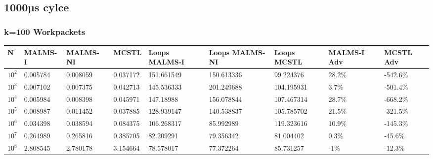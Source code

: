\documentclass[landscape]{article}
\begin{document}
\subsection*{1000µs cylce}
\subsubsection{k=100 Workpackets}
\begin{tabular}{l|l|l|l|l|l|l|l|l}
N	& MALMS-I 	& MALMS-NI	& MCSTL		& Loops MALMS-I	& Loops MALMS-NI & Loops MCSTL & MALMS-I Adv	& MCSTL Adv		\\
\hline
$10^2$		& 0.005784	& 0.008059	& 0.037172	& 151.661549	& 150.613336	& 99.224376	& 28.2\%  	& -542.6\% \\
$10^3$		& 0.007102	& 0.007375	& 0.042713	& 145.536333	& 201.249688	& 104.195931	& 3.7\%  	& -501.4\% \\
$10^4$		& 0.005984	& 0.008398	& 0.045971	& 147.18988	& 156.078844	& 107.467314	& 28.7\%  	& -668.2\% \\
$10^5$		& 0.008987	& 0.011452	& 0.037885	& 128.939147	& 140.538837	& 105.785702	& 21.5\%  	& -321.5\% \\
$10^6$		& 0.034398	& 0.038594	& 0.084375	& 106.268317	& 85.992989	& 119.323616	& 10.9\%  	& -145.3\% \\
$10^7$		& 0.264989	& 0.265816	& 0.385705	& 82.209291	& 79.356342	& 81.004402	& 0.3\%  	& -45.6\% \\
$10^8$		& 2.808545	& 2.780178	& 3.154664	& 78.578017	& 77.372264	& 85.731257	& -1\%  	& -12.3\% \\
\end{tabular}
\end{document}
